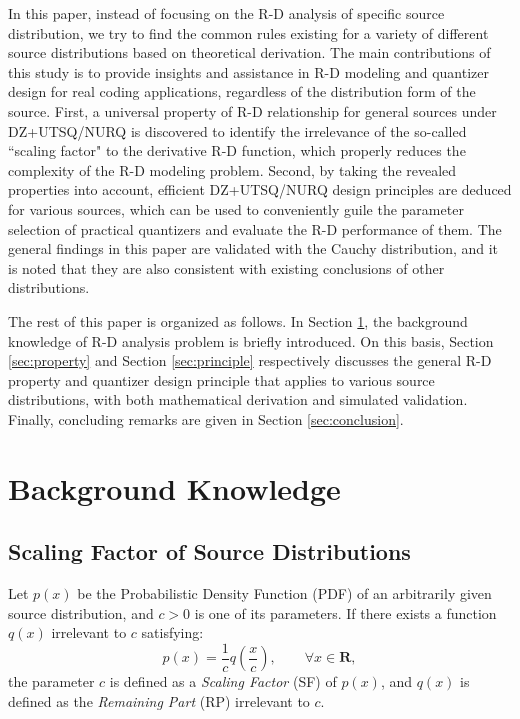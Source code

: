 \documentclass[smallabstract,smallcaptions]{dccpaper}
\begin{document}
In this paper, instead of focusing on the R-D analysis of specific source distribution, we try to find the common rules existing for a variety of different source distributions based on theoretical derivation. The main contributions of this study is to provide insights and assistance in R-D modeling and quantizer design for real coding applications, regardless of the distribution form of the source. First, a universal property of R-D relationship for general sources under DZ+UTSQ/NURQ is discovered to identify the irrelevance of the so-called ``scaling factor" to the derivative R-D function, which properly reduces the complexity of the R-D modeling problem. Second, by taking the revealed properties into account, efficient DZ+UTSQ/NURQ design principles are deduced for various sources, which can be used to conveniently guile the parameter selection of practical quantizers and evaluate the R-D performance of them. The general findings in this paper are validated with the Cauchy distribution, and it is noted that they are also consistent with existing conclusions of other distributions.

The rest of this paper is organized as follows. In Section \ref{sec:background}, the background knowledge of R-D analysis problem is briefly introduced. On this basis, Section \ref{sec:property} and Section \ref{sec:principle} respectively discusses the general R-D property and quantizer design principle that applies to various source distributions, with both mathematical derivation and simulated validation. Finally, concluding remarks are given in Section \ref{sec:conclusion}.

\section{Background Knowledge}
\label{sec:background}

\subsection{Scaling Factor of Source Distributions}

Let $p(x)$ be the Probabilistic Density Function (PDF) of an arbitrarily given source distribution, and $c>0$ is one of its parameters. If there exists a function $q(x)$ irrelevant to $c$ satisfying:
\begin{equation}
\label{equ:SF}
p(x)=\frac{1}{c} q(\frac{x}{c}),\qquad \forall x \in \mathbf{R},
\end{equation}
the parameter $c$ is defined as a \emph{Scaling Factor} (SF) of $p(x)$, and $q(x)$ is defined as the \emph{Remaining Part} (RP) irrelevant to $c$.
\end{document}

